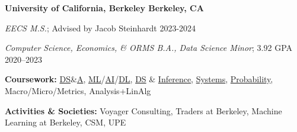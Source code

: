 \textbf{University of California, Berkeley \hfill Berkeley, CA} \par
\textit{EECS M.S.}; Advised by Jacob Steinhardt \hfill 2023-2024\par
\textit{Computer Science, Economics, \& ORMS B.A., Data Science Minor}; 3.92 GPA \hfill 2020--2023\par
\textbf{Coursework:} \href{https://sp23.datastructur.es/}{DS}\&\href{https://cs170.org/}{A}, \href{https://www.eecs189.org/}{ML}/\href{https://inst.eecs.berkeley.edu/~cs188/fa22/}{AI}/\href{https://inst.eecs.berkeley.edu/~cs182/sp23/}{DL}, \href{https://ds100.org/}{DS} \& \href{https://data102.org/fa22/}{Inference}, \href{https://inst.eecs.berkeley.edu/~cs61c/fa22/}{Systems}, \href{https://www.stat134.org/}{Probability}, Macro/Micro/Metrics, Analysis+LinAlg \par
\textbf{Activities \& Societies:} Voyager Consulting, Traders at Berkeley, Machine Learning at Berkeley, CSM, UPE